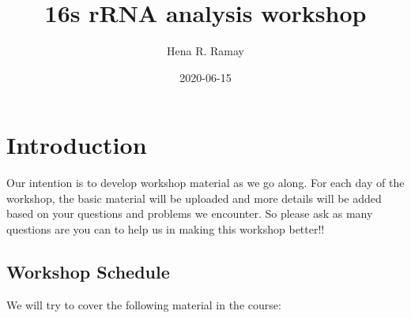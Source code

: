 \documentclass[
]{book}
\title{16s rRNA analysis workshop}
\author{Hena R. Ramay}
\date{2020-06-15}
\begin{document}
\maketitle

{
\setcounter{tocdepth}{1}
\tableofcontents
}
\hypertarget{introduction}{%
\chapter{Introduction}\label{introduction}}

Our intention is to develop workshop material as we go along. For each day of the workshop, the basic material will be uploaded and more details will be added based on your questions and problems we encounter. So please ask as many questions are you can to help us in making this workshop better!!

\hypertarget{workshop-schedule}{%
\section{Workshop Schedule}\label{workshop-schedule}}

We will try to cover the following material in the course:
\end{document}

